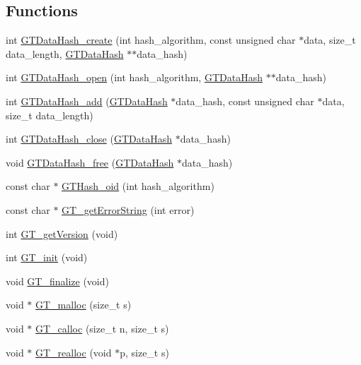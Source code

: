 \subsection*{Functions}
\begin{DoxyCompactItemize}
\item 
int \hyperlink{group__common_ga6fd1be4d24783c063c414058f22395f2}{GTDataHash\_\-create} (int hash\_\-algorithm, const unsigned char $\ast$data, size\_\-t data\_\-length, \hyperlink{struct_g_t_message_digest__st}{GTDataHash} $\ast$$\ast$data\_\-hash)
\item 
int \hyperlink{group__common_gacf607cae9a65dfc7bb4d356279d4700e}{GTDataHash\_\-open} (int hash\_\-algorithm, \hyperlink{struct_g_t_message_digest__st}{GTDataHash} $\ast$$\ast$data\_\-hash)
\item 
int \hyperlink{group__common_gabe9c209fccd1f795d126a6b3a89a62fb}{GTDataHash\_\-add} (\hyperlink{struct_g_t_message_digest__st}{GTDataHash} $\ast$data\_\-hash, const unsigned char $\ast$data, size\_\-t data\_\-length)
\item 
int \hyperlink{group__common_ga7a93b38f14cff1f73b363d61502bb1a1}{GTDataHash\_\-close} (\hyperlink{struct_g_t_message_digest__st}{GTDataHash} $\ast$data\_\-hash)
\item 
void \hyperlink{group__common_gaff69acd5ef8287b0eca9fe14d3be5e57}{GTDataHash\_\-free} (\hyperlink{struct_g_t_message_digest__st}{GTDataHash} $\ast$data\_\-hash)
\item 
const char $\ast$ \hyperlink{group__common_gababe6a9e0bca4400a65c10914bb20a2e}{GTHash\_\-oid} (int hash\_\-algorithm)
\item 
const char $\ast$ \hyperlink{group__common_gaf03ec60bbbf4da31f46e6420ec7bb3d4}{GT\_\-getErrorString} (int error)
\item 
int \hyperlink{group__common_ga29f20e0dcc653a818552d01aa8b02369}{GT\_\-getVersion} (void)
\item 
int \hyperlink{group__common_gafb831f40c4486b882d9eef38d7c85f94}{GT\_\-init} (void)
\item 
void \hyperlink{group__common_ga3facfda504f40ddda537fcb91fc6c712}{GT\_\-finalize} (void)
\item 
void $\ast$ \hyperlink{group__common_ga9620e1d79a0ca9901be12eded4346b6e}{GT\_\-malloc} (size\_\-t s)
\item 
void $\ast$ \hyperlink{group__common_gab3c710e11d4beb606c697f0476ed3324}{GT\_\-calloc} (size\_\-t n, size\_\-t s)
\item 
void $\ast$ \hyperlink{group__common_ga69604583989a4d9320bb5542fc3910d3}{GT\_\-realloc} (void $\ast$p, size\_\-t s)

\end{DoxyCompactItemize}
